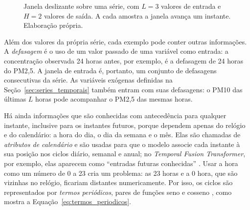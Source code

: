 \begin{figure}[htbp]
    \centering
    \caption[Janela deslizante sobre uma série, com \(L=3\) valores de entrada e \(H=2\) valores de saída]{Janela deslizante sobre uma série, com \(L=3\) valores de entrada e \(H=2\) valores de saída. A cada amostra a janela avança um instante. Elaboração própria.}
    \label{fig:janelamento}
\end{figure}

Além dos valores da própria série, cada exemplo pode conter outras informações. A \emph{defasagem} é o uso de um valor passado de uma variável como entrada: a concentração observada 24 horas antes, por exemplo, é a defasagem de 24 horas do PM2,5. A janela de entrada é, portanto, um conjunto de defasagens consecutivas da série. As variáveis exógenas definidas na Seção~\ref{sec:series_temporais} também entram com suas defasagens: o PM10 das últimas \(L\) horas pode acompanhar o PM2,5 das mesmas horas.

Há ainda informações que são conhecidas com antecedência para qualquer instante, inclusive para os instantes futuros, porque dependem apenas do relógio e do calendário: a hora do dia, o dia da semana e o mês. Elas são chamadas de \emph{atributos de calendário} e são usadas para que o modelo associe cada instante à sua posição nos ciclos diário, semanal e anual; no \textit{Temporal Fusion Transformer}, por exemplo, elas aparecem como ``entradas futuras conhecidas'' \cite{lim2021tft}. Usar a hora como um número de 0 a 23 cria um problema: as 23 horas e a 0 hora, que são vizinhas no relógio, ficariam distantes numericamente. Por isso, os ciclos são representados por \emph{termos periódicos}, pares de funções seno e cosseno \cite{hyndman2021forecasting}, como mostra a Equação~\ref{eq:termos_periodicos}.

